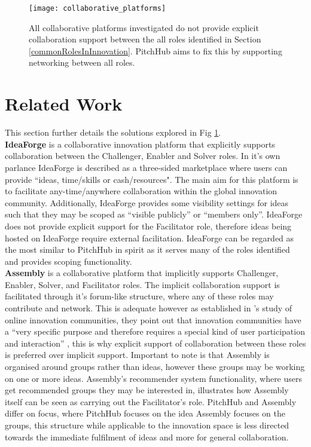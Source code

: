 \begin{figure}[ht]
    \centering
    \texttt{[image: collaborative\_platforms]}
    \caption{All collaborative platforms investigated do not provide explicit collaboration support between the all roles identified in Section \ref{commonRolesInInnovation}. PitchHub aims to fix this by supporting networking between all roles. }
    \label{fig:collaborative_platforms}
\end{figure}

\section{Related Work}

This section further details the solutions explored in Fig \ref{fig:collaborative_platforms}.
\\
\newline
\textbf{IdeaForge} \cite{ideaForge:online}
is a collaborative innovation platform that explicitly supports collaboration between the Challenger, Enabler and Solver roles. In it's own parlance IdeaForge is described as a three-sided marketplace where users can provide ``ideas, time/skills or cash/resources". The main aim for this platform is to facilitate any-time/anywhere collaboration within the global innovation community. Additionally, IdeaForge provides some visibility settings for ideas such that they may be scoped as ``visible publicly'' or ``members only''. IdeaForge does not provide explicit support for the Facilitator role, therefore ideas being hosted on IdeaForge require external facilitation. IdeaForge can be regarded as the most similar to PitchHub in spirit as it serves many of the roles identified and provides scoping functionality.
\\
\newline
\textbf{Assembly} \cite{assembly:online}
is a collaborative platform that implicitly supports Challenger, Enabler, Solver, and Facilitator roles. The implicit collaboration support is facilitated through it's forum-like structure, where any of these roles may contribute and network. This is adequate however as established in \citeauthor{hautz2010establish}'s study of online innovation communities, they point out that innovation communities have a ``very specific purpose and therefore requires a special kind of user participation and interaction'' \cite{hautz2010establish}, this is why explicit support of collaboration between these roles is preferred over implicit support. Important to note is that Assembly is organised around groups rather than ideas, however these groups may be working on one or more ideas. Assembly's recommender system functionality, where users get recommended groups they may be interested in, illustrates how Assembly itself can be seen as carrying out the Facilitator's role. PitchHub and Assembly differ on focus, where PitchHub focuses on the idea Assembly focuses on the groups, this structure while applicable to the innovation space is less directed towards the immediate fulfilment of ideas and more for general collaboration.
